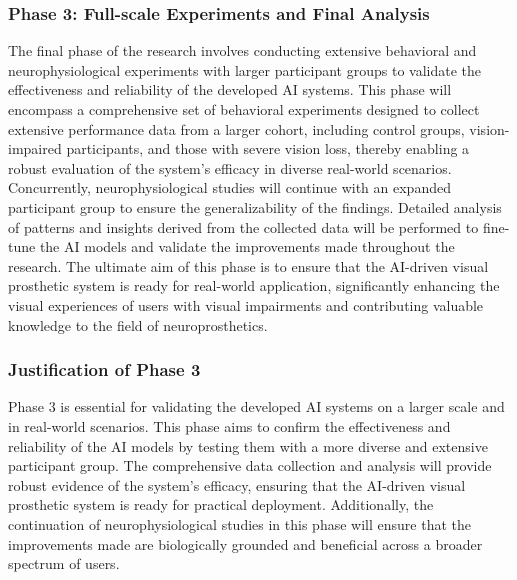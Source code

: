\documentclass[10pt]{article}
\begin{document}
\subsubsection*{Phase 3: Full-scale Experiments and Final Analysis}
The final phase of the research involves conducting extensive behavioral and
neurophysiological experiments with larger participant groups to validate the
effectiveness and reliability of the developed AI systems. This phase will
encompass a comprehensive set of behavioral experiments designed to collect
extensive performance data from a larger cohort, including control groups,
vision-impaired participants, and those with severe vision loss, thereby
enabling a robust evaluation of the system's efficacy in diverse real-world
scenarios. Concurrently, neurophysiological studies will continue with an
expanded participant group to ensure the generalizability of the findings.
Detailed analysis of patterns and insights derived from the collected data will
be performed to fine-tune the AI models and validate the improvements made
throughout the research. The ultimate aim of this phase is to ensure that the
AI-driven visual prosthetic system is ready for real-world application,
significantly enhancing the visual experiences of users with visual impairments
and contributing valuable knowledge to the field of neuroprosthetics.

\subsubsection*{Justification of Phase 3}
Phase 3 is essential for validating the developed AI systems on a larger scale
and in real-world scenarios. This phase aims to confirm the effectiveness and
reliability of the AI models by testing them with a more diverse and extensive
participant group. The comprehensive data collection and analysis will provide
robust evidence of the system's efficacy, ensuring that the AI-driven visual
prosthetic system is ready for practical deployment. Additionally, the
continuation of neurophysiological studies in this phase will ensure that the
improvements made are biologically grounded and beneficial across a broader
spectrum of users.
\end{document}
